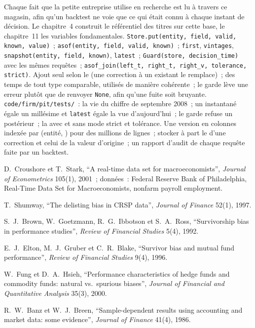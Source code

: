 \begin{build}
 Chaque fait que la petite entreprise utilise en recherche est lu à travers ce magasin, afin qu'un backtest ne voie que ce
qui était connu à chaque instant de décision. Le chapitre~4 construit le référentiel des titres sur cette base, le chapitre~11 les variables fondamentales.
 \texttt{Store.put(entity, field, valid, known, value)}~; \texttt{asof(entity, field, valid, known)}~;
\texttt{first}, \texttt{vintages}, \texttt{snapshot(entity, field, known)}, \texttt{latest}~; \texttt{Guard(store,
decision\_time)} avec les mêmes requêtes~; \texttt{asof\_join(left\_t, right\_t, right\_v, tolerance, strict)}.
 Ajout seul selon le  (une correction à un  existant le remplace)~; des temps de tout type comparable,
utilisés de manière cohérente~; le garde lève une erreur plutôt que de renvoyer \texttt{None}, afin qu'une fuite soit bruyante.
 \texttt{code/firm/pit/tests/}~: la vie du chiffre de septembre 2008~; un instantané égale un millésime et
\texttt{latest} égale la vue d'aujourd'hui~; le garde refuse un  postérieur~; la  avec et sans mode strict et
tolérance.
 Une version en colonnes indexée par (entité, ) pour des millions de lignes~; stocker à part le  d'une
correction et celui de la valeur d'origine~; un rapport d'audit de chaque requête faite par un backtest.
\end{build}

\begin{omsources}
\item D.~Croushore et T.~Stark, ``A real-time data set for macroeconomists'', \emph{Journal of Econometrics} 105(1), 2001~;
données~: Federal Reserve Bank of Philadelphia, Real-Time Data Set for Macroeconomists, nonfarm payroll employment.
\item T.~Shumway, ``The delisting bias in CRSP data'', \emph{Journal of Finance} 52(1), 1997.
\item S.~J.~Brown, W.~Goetzmann, R.~G.~Ibbotson et S.~A.~Ross, ``Survivorship bias in performance studies'', \emph{Review of
Financial Studies} 5(4), 1992.
\item E.~J.~Elton, M.~J.~Gruber et C.~R.~Blake, ``Survivor bias and mutual fund performance'', \emph{Review of Financial Studies}
9(4), 1996.
\item W.~Fung et D.~A.~Hsieh, ``Performance characteristics of hedge funds and commodity funds: natural vs.\ spurious biases'',
\emph{Journal of Financial and Quantitative Analysis} 35(3), 2000.
\item R.~W.~Banz et W.~J.~Breen, ``Sample-dependent results using accounting and market data: some evidence'', \emph{Journal of
Finance} 41(4), 1986.
\end{omsources}

